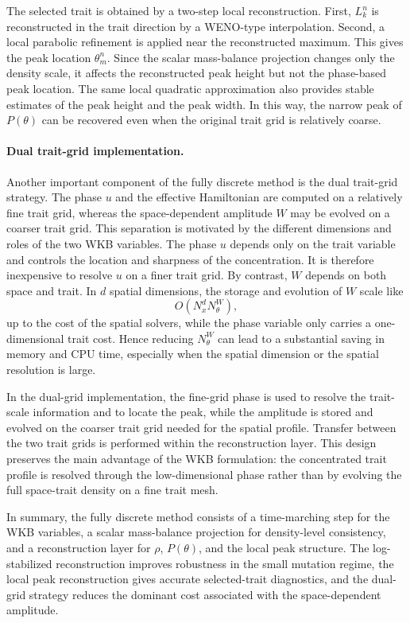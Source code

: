 \documentclass[11pt]{article}
\begin{document}
The selected trait is obtained by a two-step local reconstruction.  First,
\(L_k^n\) is reconstructed in the trait direction by a WENO-type interpolation.
Second, a local parabolic refinement is applied near the reconstructed maximum.
This gives the peak location \(\theta_m^n\).  Since the scalar mass-balance
projection changes only the density scale, it affects the reconstructed peak
height but not the phase-based peak location.  The same local quadratic
approximation also provides stable estimates of the peak height and the peak
width.  In this way, the narrow peak of \(P(\theta)\) can be recovered even when
the original trait grid is relatively coarse.

\paragraph{Dual trait-grid implementation.}

Another important component of the fully discrete method is the dual trait-grid
strategy.  The phase \(u\) and the effective Hamiltonian are computed on a
relatively fine trait grid, whereas the space-dependent amplitude \(W\) may be
evolved on a coarser trait grid.  This separation is motivated by the different
dimensions and roles of the two WKB variables.  The phase \(u\) depends only on
the trait variable and controls the location and sharpness of the
concentration.  It is therefore inexpensive to resolve \(u\) on a finer trait
grid.  By contrast, \(W\) depends on both space and trait.  In \(d\) spatial
dimensions, the storage and evolution of \(W\) scale like
\[
    O(N_x^d N_\theta^W),
\]
up to the cost of the spatial solvers, while the phase variable only carries a
one-dimensional trait cost.  Hence reducing \(N_\theta^W\) can lead to a
substantial saving in memory and CPU time, especially when the spatial dimension
or the spatial resolution is large.

In the dual-grid implementation, the fine-grid phase is used to resolve the
trait-scale information and to locate the peak, while the amplitude is stored
and evolved on the coarser trait grid needed for the spatial profile.  Transfer
between the two trait grids is performed within the reconstruction layer.  This
design preserves the main advantage of the WKB formulation: the concentrated
trait profile is resolved through the low-dimensional phase rather than by
evolving the full space-trait density on a fine trait mesh.

In summary, the fully discrete method consists of a time-marching step for the
WKB variables, a scalar mass-balance projection for density-level consistency,
and a reconstruction layer for \(\rho\), \(P(\theta)\), and the local peak
structure.  The log-stabilized reconstruction improves robustness in the small
mutation regime, the local peak reconstruction gives accurate selected-trait
diagnostics, and the dual-grid strategy reduces the dominant cost associated
with the space-dependent amplitude.
\end{document}
